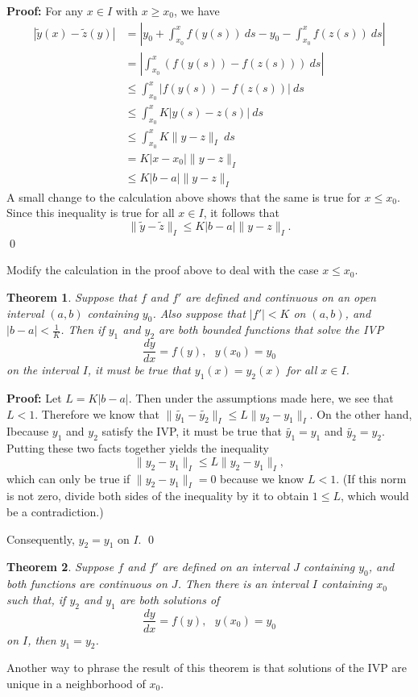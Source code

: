 \documentclass[12pt,letterpaper,twoside]{amsart}
\newcounter{exercise}
\newtheorem{theorem}{Theorem}
\renewcommand{\proof}{{\bf Proof:}}
\newcommand{\exercise}{\bigskip \noindent {\large {\sc Exercise \arabic{exercise}:}} \addtocounter{exercise}{1}}
\begin{document}
\proof 
For any $x \in I$ with $x \geq x_0$, we have
\begin{align*}
|\tilde{y}(x)-\tilde{z}(y)|
& = \left| y_0 + \int_{x_0}^x f(y(s)) \ ds - y_0 - \int_{x_0}^x f(z(s)) \ ds \right| \\
& = \left| \int_{x_0}^x (f(y(s)) - f(z(s))) \ ds \right| \\
& \leq \int_{x_0}^x |f(y(s))-f(z(s))| \ ds \\
& \leq \int_{x_0}^x K |y(s)-z(s)| \ ds \\
& \leq \int_{x_0}^x K \parallel y - z \parallel_I \ ds \\
& = K |x-x_0| \parallel y-z \parallel_I \\
& \leq K|b-a|\parallel y-z \parallel_I
\end{align*}
A small change to the calculation above shows that the same is true for $x \leq x_0$.  Since this inequality is true for all $x \in I$, it follows that 
\[\parallel \tilde{y}-\tilde{z} \parallel_I \leq K|b-a| \parallel y-z \parallel_I.\]
\qed

\exercise Modify the calculation in the proof above to deal with the case $x \leq x_0$.

\begin{theorem} Suppose that $f$ and $f'$ are defined and continuous on an open interval $(a,b)$ containing $y_0$.  Also suppose that  $|f'|<K$ on $(a,b)$, and $|b-a| < \frac{1}{K}$.  Then if $y_1$ and $y_2$ are both bounded functions that solve the IVP
\[ \frac{dy}{dx}= f(y), \ \ \ y(x_0)=y_0 \]
on the interval $I$, it must be true that $y_1(x)=y_2(x)$ for all $x \in I$.
\end{theorem}

\proof 
Let $L=K|b-a|$.  Then under the assumptions made here, we see that $L<1$.  Therefore we know that $\parallel \tilde{y_1} - \tilde{y_2} \parallel_I \leq L \parallel y_2 - y_1 \parallel_I.$  On the other hand, Ibecause $y_1$ and $y_2$ satisfy the IVP, it must be true that $\tilde{y_1}=y_1$ and $\tilde{y_2}=y_2$.  Putting these two facts together yields the inequality
\[ \parallel y_2-y_1 \parallel_I \leq L \parallel y_2-y_1 \parallel_I,\]
which can only be true if $\parallel y_2-y_1 \parallel_I = 0$ because we know $L < 1$.  (If this norm is not zero, divide both sides of the inequality by it to obtain $1 \leq L$, which would be a contradiction.)

Consequently, $y_2=y_1$ on $I$.
\qed

\begin{theorem} 
Suppose $f$ and $f'$ are defined on an interval $J$ containing $y_0$, and both functions are continuous on $J$.  Then there is an interval $I$ containing $x_0$ such that, if $y_2$ and $y_1$ are both solutions of 
\[ \frac{dy}{dx}=f(y), \ \ \ y(x_0)=y_0\]
on $I$, then $y_1=y_2$.
\end{theorem}
Another way to phrase the result of this theorem is that solutions of the IVP are unique in a neighborhood of $x_0$.
\end{document}
